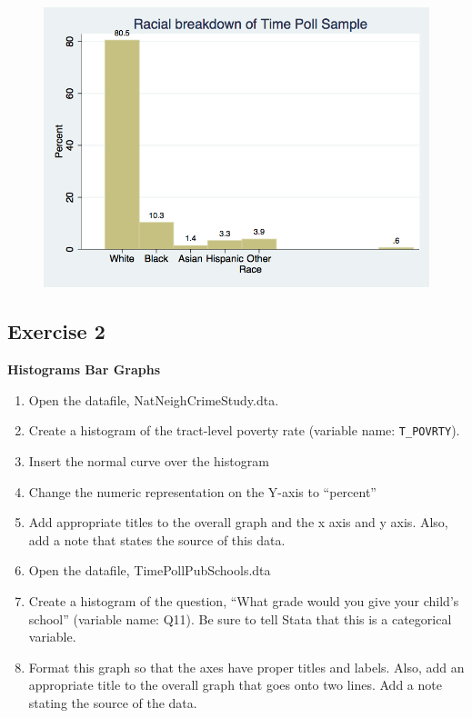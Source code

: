 \documentclass[]{book}
\providecommand{\tightlist}{%
  \setlength{\itemsep}{0pt}\setlength{\parskip}{0pt}}
\begin{document}
\begin{figure}
\centering
\includegraphics{Stata/StataModGraph/images/bargraph.png}
\caption{}
\end{figure}

\subsection{Exercise 2}\label{exercise-2-6}

\textbf{Histograms Bar Graphs}

\begin{enumerate}
\def\labelenumi{\arabic{enumi}.}
\tightlist
\item
  Open the datafile, NatNeighCrimeStudy.dta.
\item
  Create a histogram of the tract-level poverty rate (variable name:
  \texttt{T\_POVRTY}).
\item
  Insert the normal curve over the histogram
\item
  Change the numeric representation on the Y-axis to ``percent''
\item
  Add appropriate titles to the overall graph and the x axis and y axis.
  Also, add a note that states the source of this data.
\item
  Open the datafile, TimePollPubSchools.dta
\item
  Create a histogram of the question, ``What grade would you give your
  child's school'' (variable name: Q11). Be sure to tell Stata that this
  is a categorical variable.
\item
  Format this graph so that the axes have proper titles and labels.
  Also, add an appropriate title to the overall graph that goes onto two
  lines. Add a note stating the source of the data.
\end{enumerate}
\end{document}
